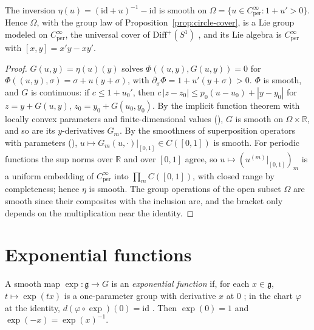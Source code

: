 \begin{theorem}
  \label{thm:circle-cover-lie}
  \leanok
  The inversion $\eta(u) = (\mathrm{id} + u)^{-1} - \mathrm{id}$ is smooth on
  $\Omega = \{u \in C^\infty_{\mathrm{per}} : 1 + u' > 0\}$. Hence $\Omega$, with the group law
  of Proposition~\ref{prop:circle-cover}, is a Lie group modeled on $C^\infty_{\mathrm{per}}$, the
  universal cover of $\mathrm{Diff}^+(S^1)$ \cite[\S 13.3]{GN26}, and its Lie algebra is
  $C^\infty_{\mathrm{per}}$ with $[x, y] = x' y - x y'$.
\end{theorem}

\begin{proof}
  \leanok
  $G(u, y) = \eta(u)(y)$ solves $\Phi((u, y), G(u, y)) = 0$ for
  $\Phi((u, y), \sigma) = \sigma + u(y + \sigma)$, with $\partial_\sigma \Phi = 1 + u'(y + \sigma) > 0$.
  $\Phi$ is smooth, and $G$ is continuous: if $c \le 1 + u_0'$, then
  $c\,|z - z_0| \le p_0(u - u_0) + |y - y_0|$ for $z = y + G(u, y)$, $z_0 = y_0 + G(u_0, y_0)$. By the
  implicit function theorem with locally convex parameters and finite-dimensional values
  (\cite{LCA}), $G$ is smooth on $\Omega \times \mathbb{R}$, and so are its $y$-derivatives
  $G_m$. By the smoothness of superposition operators with parameters (\cite{LCA}),
  $u \mapsto G_m(u, \cdot)|_{[0,1]} \in C([0, 1])$ is smooth. For periodic functions the sup norms
  over $\mathbb{R}$ and over $[0, 1]$ agree, so $u \mapsto (u^{(m)}|_{[0,1]})_m$ is a uniform
  embedding of $C^\infty_{\mathrm{per}}$ into $\prod_m C([0, 1])$, with closed range by completeness;
  hence $\eta$ is smooth. The group operations of the open subset $\Omega$ are smooth since their
  composites with the inclusion are, and the bracket only depends on the multiplication near the
  identity.
\end{proof}

\section{Exponential functions}

\begin{definition}
  \label{def:exp}
  \leanok
  A smooth map $\exp\colon \mathfrak g \to G$ is an \emph{exponential function} if, for each
  $x \in \mathfrak g$, $t \mapsto \exp(tx)$ is a one-parameter group with derivative $x$ at $0$
  \cite[Definition 5.6.1]{GN26}; in the chart $\varphi$ at the identity, $d(\varphi \circ \exp)(0) =
  \mathrm{id}$ \cite[(5.14)]{GN26}. Then $\exp(0) = 1$ and $\exp(-x) = \exp(x)^{-1}$.
\end{definition}

